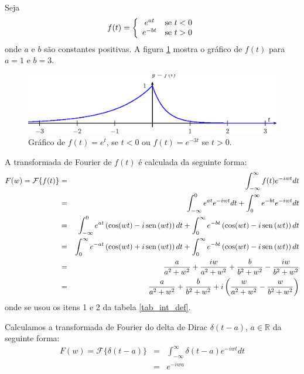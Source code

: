 \begin{ex} Seja 
\begin{equation}f(t)=\left\{\begin{array}{cc}e^{at}&\hbox{se}\ t<0\\
e^{-bt}&\hbox{se}\ t>0
\end{array}\right.
\end{equation}
onde $a$ e $b$ são constantes positivas. A figura \ref{fig_trans_1} mostra o gráfico de $f(t)$ para $a=1$ e $b=3$.
\begin{figure}[!ht]
\begin{center}
\includegraphics{cap_transformada_de_fourier/pics/figura_7}\end{center}
\caption{\label{fig_trans_1} Gráfico de $f(t)=e^{t}$, se $t<0$ ou $f(t)=e^{-3t}$ se $t>0$.  }
\end{figure}
A transformada de Fourier de $f(t)$ é calculada da seguinte forma:
\begin{eqnarray*}
F(w)=\mathcal{F}\{f(t)\}&=&\int_{-\infty}^\infty f(t) e^{-i w t}dt\\
&=&\int_{-\infty}^0 e^{at} e^{-i w t}dt+\int_{0}^\infty e^{-bt} e^{-i w t}dt\\
&=&\int_{-\infty}^0 e^{at} \left(\cos(wt)-i\operatorname{sen}\,(wt)\right)dt+\int_{0}^\infty e^{-bt} \left(\cos(wt)-i\operatorname{sen}\,(wt)\right)dt\\
&=&\int_{0}^\infty e^{-at} \left(\cos(wt)+i\operatorname{sen}\,(wt)\right)dt+\int_{0}^\infty e^{-bt} \left(\cos(wt)-i\operatorname{sen}\,(wt)\right)dt\\
&=&\frac{a}{a^2+w^2}+\frac{iw}{a^2+w^2}+\frac{b}{b^2+w^2}-\frac{iw}{b^2+w^2}\\
&=&\frac{a}{a^2+w^2}+\frac{b}{b^2+w^2}+i\left(\frac{w}{a^2+w^2}-\frac{w}{b^2+w^2}\right)
\end{eqnarray*}
onde se usou os itens 1 e 2 da tabela \ref{tab_int_def}.
\end{ex}
\begin{ex} Calculamos a transformada de Fourier do delta de Dirac $\delta(t-a)$, $a\in\mathbb{R}$ da seguinte forma:
\begin{eqnarray*}
F(w)=\mathcal{F}\{\delta(t-a)\}&=&\int_{-\infty}^\infty \delta(t-a) e^{-i w t}dt\\
&=&e^{-i w a}
\end{eqnarray*}
\end{ex}
